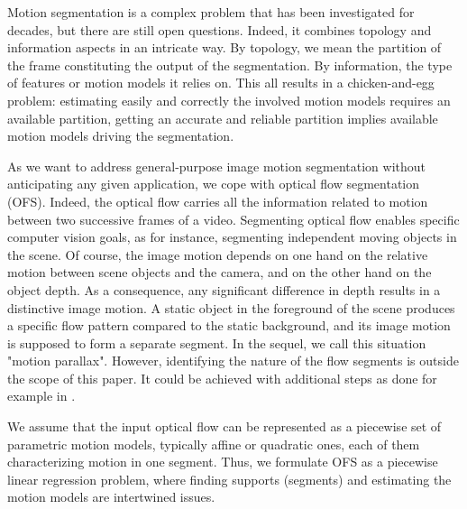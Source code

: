 \documentclass[10pt,twocolumn,letterpaper]{article}
\begin{document}
Motion segmentation is a complex problem that has been investigated for decades, but there are still open questions. Indeed, it combines topology and information aspects in an intricate way. By topology, we mean the partition of the frame constituting the output of the segmentation. By information, the type of features or motion models it relies on. This all results in a chicken-and-egg problem: estimating easily and correctly the involved motion models requires an available partition, getting an accurate and reliable partition implies available motion models driving the segmentation.

As we want to address general-purpose image motion segmentation without anticipating any given application, we cope with {\color{black} optical flow segmentation (OFS)}. Indeed, the optical flow carries all the information related to motion between two successive frames of a video. {\color{black} Segmenting optical flow enables specific computer vision goals, as for instance, segmenting independent moving objects in the scene. Of course, the image motion depends on one hand on the relative motion between scene objects and the camera, and on the other hand on the object depth. As a consequence, any significant difference in depth results in a distinctive image motion. A static object in the foreground of the scene produces a specific flow pattern compared to the static background, and its image motion is supposed to form a separate segment. In the sequel, we call this situation "motion parallax". However, identifying the nature of the flow segments is outside the scope of this paper. It could be achieved with additional steps as done for example in \cite{meunier2021}.}

We assume that the input optical flow can be represented as a piecewise set of parametric motion models, typically affine or quadratic ones, each of them characterizing motion in one segment. Thus, we {\color{black} formulate OFS} as a piecewise linear regression problem, where finding supports (segments) and estimating the motion models are intertwined issues. 
\end{document}
